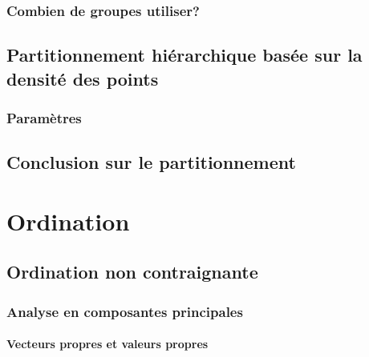 \documentclass[]{book}
\let\oldparagraph\paragraph
\renewcommand{\paragraph}[1]{\oldparagraph{#1}\mbox{}}
\begin{document}
\hypertarget{combien-de-groupes-utiliser}{%
\subsubsection{Combien de groupes
utiliser?}\label{combien-de-groupes-utiliser}}

\hypertarget{partitionnement-hiuxe9rarchique-basuxe9e-sur-la-densituxe9-des-points}{%
\subsection{Partitionnement hiérarchique basée sur la densité des
points}\label{partitionnement-hiuxe9rarchique-basuxe9e-sur-la-densituxe9-des-points}}

\hypertarget{paramuxe8tres}{%
\subsubsection{Paramètres}\label{paramuxe8tres}}

\hypertarget{conclusion-sur-le-partitionnement}{%
\subsection{Conclusion sur le
partitionnement}\label{conclusion-sur-le-partitionnement}}

\hypertarget{ordination}{%
\section{Ordination}\label{ordination}}

\hypertarget{ordination-non-contraignante}{%
\subsection{Ordination non
contraignante}\label{ordination-non-contraignante}}

\hypertarget{analyse-en-composantes-principales}{%
\subsubsection{Analyse en composantes
principales}\label{analyse-en-composantes-principales}}

\hypertarget{vecteurs-propres-et-valeurs-propres}{%
\paragraph{Vecteurs propres et valeurs
propres}\label{vecteurs-propres-et-valeurs-propres}}
\end{document}
